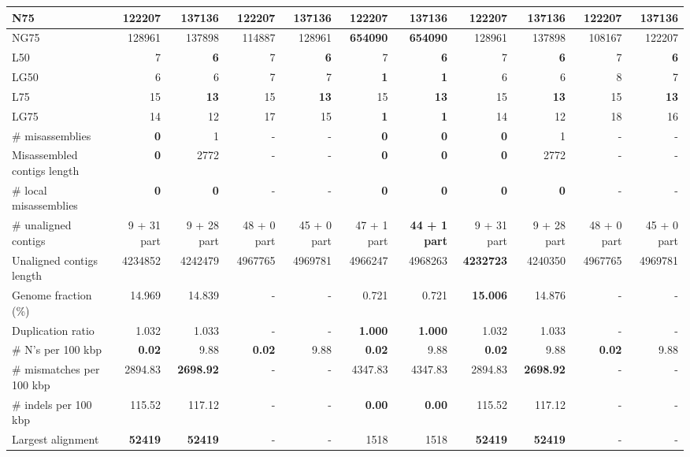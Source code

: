 \documentclass[12pt,a4paper]{article}
\begin{document}
\begin{table}[ht]
\begin{center}
\begin{tabular}{|l*{10}{|r}|}
N75 & 122207 & {\bf 137136} & 122207 & {\bf 137136} & 122207 & {\bf 137136} & 122207 & {\bf 137136} & 122207 & {\bf 137136} \\ \hline
NG75 & 128961 & 137898 & 114887 & 128961 & {\bf 654090} & {\bf 654090} & 128961 & 137898 & 108167 & 122207 \\ \hline
L50 & 7 & {\bf 6} & 7 & {\bf 6} & 7 & {\bf 6} & 7 & {\bf 6} & 7 & {\bf 6} \\ \hline
LG50 & 6 & 6 & 7 & 7 & {\bf 1} & {\bf 1} & 6 & 6 & 8 & 7 \\ \hline
L75 & 15 & {\bf 13} & 15 & {\bf 13} & 15 & {\bf 13} & 15 & {\bf 13} & 15 & {\bf 13} \\ \hline
LG75 & 14 & 12 & 17 & 15 & {\bf 1} & {\bf 1} & 14 & 12 & 18 & 16 \\ \hline
\# misassemblies & {\bf 0} & 1 & - & - & {\bf 0} & {\bf 0} & {\bf 0} & 1 & - & - \\ \hline
Misassembled contigs length & {\bf 0} & 2772 & - & - & {\bf 0} & {\bf 0} & {\bf 0} & 2772 & - & - \\ \hline
\# local misassemblies & {\bf 0} & {\bf 0} & - & - & {\bf 0} & {\bf 0} & {\bf 0} & {\bf 0} & - & - \\ \hline
\# unaligned contigs & 9 + 31 part & 9 + 28 part & 48 + 0 part & 45 + 0 part & 47 + 1 part & {\bf 44 + 1 part} & 9 + 31 part & 9 + 28 part & 48 + 0 part & 45 + 0 part \\ \hline
Unaligned contigs length & 4234852 & 4242479 & 4967765 & 4969781 & 4966247 & 4968263 & {\bf 4232723} & 4240350 & 4967765 & 4969781 \\ \hline
Genome fraction (\%) & 14.969 & 14.839 & - & - & 0.721 & 0.721 & {\bf 15.006} & 14.876 & - & - \\ \hline
Duplication ratio & 1.032 & 1.033 & - & - & {\bf 1.000} & {\bf 1.000} & 1.032 & 1.033 & - & - \\ \hline
\# N's per 100 kbp & {\bf 0.02} & 9.88 & {\bf 0.02} & 9.88 & {\bf 0.02} & 9.88 & {\bf 0.02} & 9.88 & {\bf 0.02} & 9.88 \\ \hline
\# mismatches per 100 kbp & 2894.83 & {\bf 2698.92} & - & - & 4347.83 & 4347.83 & 2894.83 & {\bf 2698.92} & - & - \\ \hline
\# indels per 100 kbp & 115.52 & 117.12 & - & - & {\bf 0.00} & {\bf 0.00} & 115.52 & 117.12 & - & - \\ \hline
Largest alignment & {\bf 52419} & {\bf 52419} & - & - & 1518 & 1518 & {\bf 52419} & {\bf 52419} & - & - \\ \hline
\end{tabular}
\end{center}
\end{table}
\end{document}
